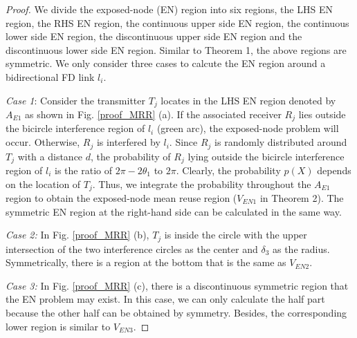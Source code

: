 \documentclass[conference]{IEEEtran}
\theoremstyle{plain}
\begin{document}
\begin{appendices}
\begin{proof}
We divide the exposed-node (EN) region into six regions, the LHS EN region, the RHS EN region, the continuous upper side EN region, the continuous lower side EN region, the discontinuous upper side EN region and the discontinuous lower side EN region. Similar to Theorem 1, the above regions are symmetric. We only consider three cases to calcute the EN region around a bidirectional FD link $l_i$.

\emph{Case 1}: Consider the transmitter $T_j$ locates in the LHS EN region denoted by $A_{E1}$ as shown in Fig. \ref{proof_MRR} (a). If the associated receiver $R_j$ lies outside the bicircle interference region of $l_i$ (green arc), the exposed-node problem will occur. Otherwise, $R_j$ is interfered by $l_i$. Since $R_j$ is randomly distributed around $T_j$ with a distance $d$, the probability of $R_j$ lying outside the bicircle interference region of $l_i$ is the ratio of $2\pi - 2\theta_1$ to $2\pi$. Clearly, the probability $p(X)$ depends on the location of $T_j$. Thus, we integrate the probability throughout the $A_{E1}$ region to obtain the exposed-node mean reuse region ($V_{EN1}$ in Theorem 2). The symmetric EN region at the right-hand side can be calculated in the same way.
	
\emph{Case 2:} In Fig. \ref{proof_MRR} (b), $T_j$ is inside the circle with the upper intersection of the two interference circles as the center and $\delta_3$ as the radius. Symmetrically, there is a region at the bottom that is the same as $V_{EN2}$.
	
\emph{Case 3:} In Fig. \ref{proof_MRR} (c), there is a discontinuous symmetric region that the EN problem may exist. In this case, we can only calculate the half part because the other half can be obtained by symmetry. Besides, the corresponding lower region is similar to $V_{EN3}$.
\end{proof}

\end{appendices} 
\end{document}
